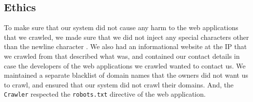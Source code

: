\subsection{Ethics}

To make sure that our system did not cause any harm to the web applications that we crawled, we made sure that we did not inject any special characters other than the newline character%
. We also had an informational website at the IP that we crawled from that described what \ehi was, and contained our contact details in case the developers of the web applications we crawled wanted to contact us. We maintained a separate blacklist of domain names that the owners did not want us to crawl, and ensured that our system did not crawl their domains. And, the \texttt{Crawler} respected the \texttt{robots.txt} directive of the web application. 
